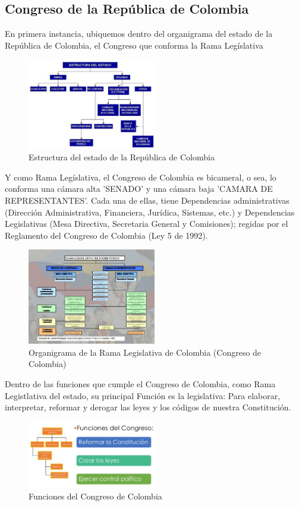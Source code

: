 \documentclass[conference]{IEEEtran}
\begin{document}
\subsection{Congreso de la República de Colombia}
    En primera instancia, ubiquemos dentro del organigrama del estado de la República de Colombia, el Congreso que conforma la Rama Legíslativa
    \begin{figure}[h]
 	  \centering
 	  \includegraphics[width=0.5\textwidth]{EEC2}
 	  \caption{Estructura del estado de la República de Colombia}
    \end{figure}   
    Y como Rama Legíslativa, el Congreso de Colombia es bicameral, o sea, lo conforma una cámara alta 'SENADO' y una cámara baja 'CAMARA DE REPRESENTANTES'. Cada una de ellas, tiene Dependencias administrativas (Dirección Administrativa, Financiera, Jurídica, Sistemas, etc.) y Dependencias Legislativas (Mesa Directiva, Secretaria General y Comisiones); regidas por el Reglamento del Congreso de Colombia (Ley 5 de 1992).
    \begin{figure}[h]
    	\centering
    	\includegraphics[width=0.5\textwidth]{RLorga}
    	\caption{Organigrama de la Rama Legislativa de Colombia (Congreso de Colombia)}
    \end{figure} 
    Dentro de las funciones que cumple el Congreso de Colombia, como Rama Legistlativa del estado, su principal Función es la legislativa: Para elaborar, interpretar, reformar y derogar las leyes y los códigos de nuestra Constitución.
    \begin{figure}[h]
    	\centering
    	\includegraphics[width=0.5\textwidth]{RLfuncion}
    	\caption{Funciones del Congreso de Colombia}
    \end{figure}
    
\end{document}
